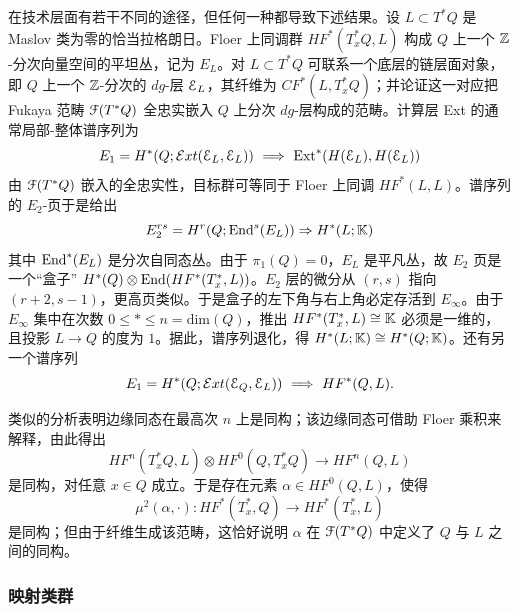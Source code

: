 在技术层面有若干不同的途径，但任何一种都导致下述结果。设 $L\subset T^*Q$ 是 Maslov 类为零的恰当拉格朗日。Floer 上同调群 $HF^*(T^*_xQ,L)$ 构成 $Q$ 上一个 $\mathbb{Z}$-分次向量空间的平坦丛，记为 $E_L$。对 $L\subset T^*Q$ 可联系一个底层的链层面对象，即 $Q$ 上一个 $\mathbb{Z}$-分次的 $dg$-层 $\EuScript{E}_L$，其纤维为 $CF^*(L, T_x^*Q)$；并论证这一对应把 Fukaya 范畴 $\EuScript{F}(T^*Q)$ 全忠实嵌入 $Q$ 上分次 $dg$-层构成的范畴。计算层 Ext 的通常局部-整体谱序列为
\[
E_1 = H^*(Q; \mathcal{E}xt(\scrE_L,\scrE_L)) \ \Longrightarrow \ \mathrm{Ext}^*(H(\scrE_L), H(\scrE_L))
\]
由 $\EuScript{F}(T^*Q)$ 嵌入的全忠实性，目标群可等同于 Floer 上同调 $HF^*(L,L)$。谱序列的 $E_2$-页于是给出
\begin{equation} \label{eq:ss}
E_2^{rs} = H^r(Q;\mathrm{End}^s(E_L)) \Rightarrow H^*(L;\mathbb{K})
\end{equation}
其中 $\mathrm{End}^*(E_L)$ 是分次自同态丛。由于 $\pi_1(Q)=0$，$E_L$ 是平凡丛，故 $E_2$ 页是一个“盒子” $H^*(Q) \otimes \mathrm{End}(HF^*(T^*_x,L))$。$E_2$ 层的微分从 $(r,s)$ 指向 $(r+2,s-1)$，更高页类似。于是盒子的左下角与右上角必定存活到 $E_\infty$。由于 $E_{\infty}$ 集中在次数 $0\leq \ast \leq n=\mathrm{dim}(Q)$，推出 $HF^*(T^*_x,L) \cong \mathbb{K}$ 必须是一维的，且投影 $L \rightarrow Q$ 的度为 $1$。据此，谱序列退化，得 $H^*(L;\mathbb{K}) \cong H^*(Q;\mathbb{K})$。还有另一个谱序列
\begin{equation} \label{eq:ss2}
E_1 = H^*(Q; \mathcal{E}xt(\scrE_Q,\scrE_L)) \ \Longrightarrow \ HF^*(Q,L).
\end{equation}

类似的分析表明边缘同态在最高次 $n$ 上是同构；该边缘同态可借助 Floer 乘积来解释，由此得出
\[
HF^n(T_x^*Q, L) \otimes HF^0(Q, T_x^*Q) \longrightarrow HF^n(Q,L) 
\] 
是同构，对任意 $x\in Q$ 成立。于是存在元素 $\alpha \in HF^0(Q,L)$，使得
\[
\mu^2(\alpha,\cdot): HF^*(T_x^*,Q) \rightarrow HF^*(T_x^*,L)
\]
是同构；但由于纤维生成该范畴，这恰好说明 $\alpha$ 在 $\EuScript{F}(T^*Q)$ 中定义了 $Q$ 与 $L$ 之间的同构。

\subsubsection{映射类群\label{Sec:MCGIII}}

